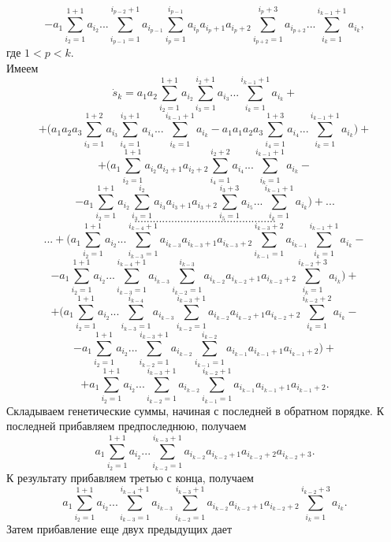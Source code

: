 \documentclass[12 pt, a4 paper]{article}
\theoremstyle{plain}   \newtheorem{Pro}{Задача}
\begin{document}
$$
  -a_1 \sum _{i_2 =1}^{1+1}a_{i_2}...
    \sum _{i_{p-1}=1}^{i_{p-2}+1}a_{i_{p-1}}
	  \sum _{i_p =1}^{i_{p-1}}a_{i_p}a_{i_p +1}a_{i_p +2}
	    \sum _{i_{p+2}=1}^{i_p +3}a_{i_{p+2}}...
		  \sum _{i_k =1}^{i_{k-1}+1}a_{i_k},
$$
где
$ 1<p<k. $ \\
Имеем
$$
  \dot s_k =a_1 a_2
    \sum _{i_2 =1}^{1+1}a_{i_2}
	  \sum _{i_3 =1}^{i_2 +1}a_{i_3}...
	    \sum _{i_k =1}^{i_{k-1}+1}a_{i_k}+
$$
$$
  + \Biggl (
    a_1 a_2 a_3 \sum _{i_3 =1}^{1+2}a_{i_3}
	  \sum _{i_4 =1}^{i_3 +1}a_{i_4}...
	    \sum _{i_k =1}^{i_{k-1}+1}a_{i_k}-
  a_1 a_1 a_2 a_3
    \sum _{i_4 =1}^{1+3}a_{i_4}...
	  \sum _{i_k =1}^{i_{k-1}+1}a_{i_k}
	    \Biggr ) +
$$
$$
  +\Biggl ( a_1
    \sum _{i_2 =1}^{1+1}a_{i_2}a_{i_2 +1}a_{i_2 +2}
	  \sum _{i_4 =1}^{i_2 +2}a_{i_4}...
	    \sum _{i_k =1}^{i_{k-1}+1}a_{i_k}-
$$
$$
  -a_1
    \sum _{i_2 =1}^{1+1}a_{i_2}
	  \sum _{i_3 =1}^{i_2}a_{i_3}a_{i_3 +1}a_{i_3 +2}
	    \sum _{i_5 =1}^{i_3 +3}a_{i_5}...
		  \sum _{i_k =1}^{i_{k-1}+1}a_{i_k}
		    \Biggr ) +...
$$
$$ \; $$
$$
  ..............................................
$$
$$ \; $$
$$
  ...+ \Biggl ( a_1
    \sum _{i_2 =1}^{1+1}a_{i_2}...
	  \sum _{i_{k-3}=1}^{i_{k-4}+1}a_{i_{k-3}}a_{i_{k-3}+1}a_{i_{k-3}+2}
	    \sum _{i_{k-1}=1}^{i_{k-3}+2}a_{i_{k-1}}
		  \sum _{i_k =1}^{i_{k-1}+1}a_{i_k}-
$$
$$
  -a_1
    \sum _{i_2 =1}^{1+1}a_{i_2}...
	  \sum _{i_{k-3}=1}^{i_{k-4}+1}a_{i_{k-3}}
	    \sum _{i_{k-2}=1}^{i_{k-3}}a_{i_{k-2}}a_{i_{k-2}+1}a_{i_{k-2}+2}
		  \sum _{i_k =1}^{i_{k-2}+3} a_{i_k}
		    \Biggr ) +
$$
$$
  + \Biggl ( a_1
    \sum _{i_2 =1}^{1+1}a_{i_2}...
	  \sum _{i_{k-3}=1}^{i_{k-4}}a_{i_{k-3}}
	    \sum _{i_{k-2}=1}^{i_{k-3}+1}a_{i_{k-2}}a_{i_{k-2}+1}a_{i_{k-2}+2}
		  \sum _{i_k =1}^{i_{k-2}+2}a_{i_k}-
$$
$$
  -a_1 \sum _{i_2 =1}^{1+1}a_{i_2}...
    \sum _{i_{k-2}=1}^{i_{k-3}+1}a_{i_{k-2}}
	  \sum _{i_{k-1}=1}^{i_{k-2}}
	    a_{i_{k-1}}a_{i_{k-1}+1}a_{i_{k-1}+2} \Biggr ) +
$$
$$
  +a_1 \sum _{i_2 =1}^{1+1}a_{i_2}...
    \sum _{i_{k-2}=1}^{i_{k-3}+1}a_{i_{k-2}}
	  \sum _{i_{k-1}=1}^{i_{k-2}+1}
	    a_{i_{k-1}}a_{i_{k-1}+1}a_{i_{k-1}+2} .
$$
Складываем генетические суммы, начиная с последней
в обратном порядке. К последней прибавляем предпоследнюю,
получаем
$$
  a_1 \sum _{i_2 =1}^{1+1}a_{i_2}...
    \sum _{i_{k-2}=1}^{i_{k-3}+1}
	  a_{i_{k-2}}a_{i_{k-2}+1}a_{i_{k-2}+2}a_{i_{k-2}+3}.
$$
К результату прибавляем третью с конца, получаем
$$
  a_1 \sum _{i_2 =1}^{1+1}a_{i_2}...
    \sum _{i_{k-3}=1}^{i_{k-4}+1}a_{i_{k-3}}
	  \sum _{i_{k-2}=1}^{i_{k-3}+1}
	    a_{i_{k-2}}a_{i_{k-2}+1}a_{i_{k-2}+2}
		  \sum _{i_k =1}^{i_{k-2}+3} a_{i_k}.
$$
Затем прибавление еще двух предыдущих дает
\end{document}
